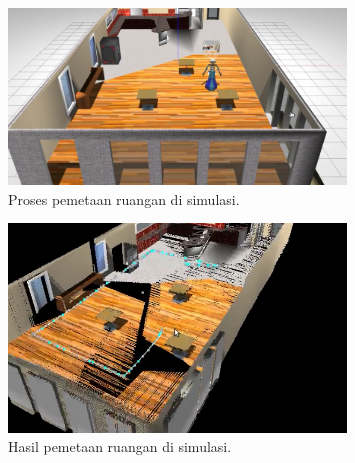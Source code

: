 
\begin{figure}[ht]
  \centering
  \includegraphics[width=0.8\textwidth,keepaspectratio]{gambar/proses-pemetaan.png}
  \caption{Proses pemetaan ruangan di simulasi.}
  \label{fig:prosespemetaan}
\end{figure}


\begin{figure}[ht]
  \centering
  \includegraphics[width=0.8\textwidth,keepaspectratio]{gambar/hasil-pemetaan.png}
  \caption{Hasil pemetaan ruangan di simulasi.}
  \label{fig:hasilpemetaan}
\end{figure}

